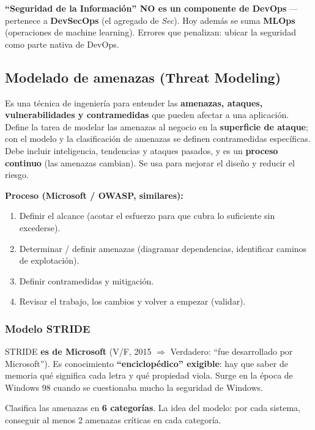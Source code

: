 \documentclass[../main.tex]{subfiles}
\begin{document}
\begin{examen}
\textbf{``Seguridad de la Información'' NO es un componente de DevOps} --- pertenece a \textbf{DevSecOps} (el agregado de \emph{Sec}). Hoy además se suma \textbf{MLOps} (operaciones de machine learning). Errores que penalizan: ubicar la seguridad como parte nativa de DevOps.
\end{examen}

\subsection{Modelado de amenazas (Threat Modeling)}

Es una técnica de ingeniería para entender las \textbf{amenazas, ataques, vulnerabilidades y contramedidas} que pueden afectar a una aplicación. Define la tarea de modelar las amenazas al negocio en la \textbf{superficie de ataque}; con el modelo y la clasificación de amenazas se definen contramedidas específicas. Debe incluir inteligencia, tendencias y ataques pasados, y es un \textbf{proceso continuo} (las amenazas cambian). Se usa para mejorar el diseño y reducir el riesgo.

\textbf{Proceso (Microsoft / OWASP, similares):}
\begin{enumerate}
  \item Definir el alcance (acotar el esfuerzo para que cubra lo suficiente sin excederse).
  \item Determinar / definir amenazas (diagramar dependencias, identificar caminos de explotación).
  \item Definir contramedidas y mitigación.
  \item Revisar el trabajo, los cambios y volver a empezar (validar).
\end{enumerate}

\subsubsection{Modelo STRIDE}

\begin{examen}
STRIDE \textbf{es de Microsoft} (V/F, 2015 $\Rightarrow$ Verdadero: ``fue desarrollado por Microsoft''). Es conocimiento \textbf{``enciclopédico'' exigible}: hay que saber de memoria qué significa cada letra y qué propiedad viola. Surge en la época de Windows 98 cuando se cuestionaba mucho la seguridad de Windows.
\end{examen}

Clasifica las amenazas en \textbf{6 categorías}. La idea del modelo: por cada sistema, conseguir al menos 2 amenazas críticas en cada categoría.
\end{document}
